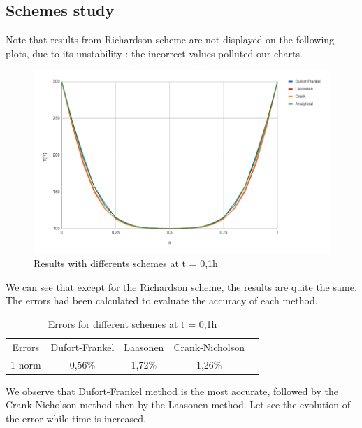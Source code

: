 \documentclass{article}
\begin{document}
        \subsection{Schemes study}
            Note that results from Richardson scheme are not displayed on the following plots, due to its unstability \cite{rich}: 
        the incorrect values polluted our charts.
        \begin{figure}[H]
            \includegraphics[width=\textwidth]{t01.png}
            \caption{Results with differents schemes at t = 0,1h}
        \end{figure}
        We can see that except for the Richardson scheme, the results are quite the same. The errors had been calculated 
        to evaluate the accuracy of each method.
        \begin{table}[H]
            \centering
            \caption{Errors for different schemes at t = 0,1h}
            \begin{tabular}{|c|c|c|c|l}
            \cline{1-4}
            Errors & Dufort-Frankel & Laasonen & Crank-Nicholson &  \\ \cline{1-4}
            1-norm & 0,56\%         & 1,72\%   & 1,26\%          &  \\ \cline{1-4}
            \end{tabular}
        \end{table}
        We observe that Dufort-Frankel method is the most accurate, 
        followed by the Crank-Nicholson method then by the Laasonen method. Let see the evolution of the error
        while time is increased.
\end{document}
